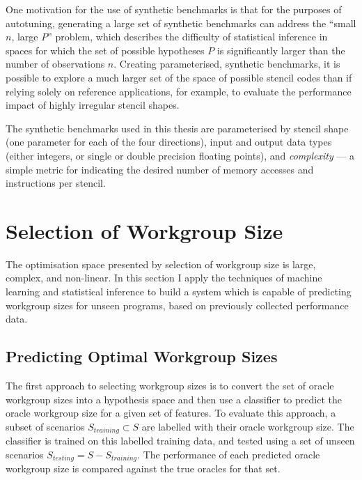 One motivation for the use of synthetic benchmarks is that for the
purposes of autotuning, generating a large set of synthetic benchmarks
can address the ``small $n$, large $P$'' problem, which describes the
difficulty of statistical inference in spaces for which the set of
possible hypotheses $P$ is significantly larger than the number of
observations $n$\CitationNeeded{}. Creating parameterised, synthetic
benchmarks, it is possible to explore a much larger set of the space
of possible stencil codes than if relying solely on reference
applications, for example, to evaluate the performance impact of
highly irregular stencil shapes.


The synthetic benchmarks used in this thesis are parameterised by
stencil shape (one parameter for each of the four directions), input
and output data types (either integers, or single or double precision
floating points), and \emph{complexity} --- a simple metric for
indicating the desired number of memory accesses and instructions per
stencil.


\section{Selection of Workgroup Size}

The optimisation space presented by selection of workgroup size is
large, complex, and non-linear. In this section I apply the techniques
of machine learning and statistical inference to build a system which
is capable of predicting workgroup sizes for unseen programs, based on
previously collected performance data.


\subsection{Predicting Optimal Workgroup Sizes}

The first approach to selecting workgroup sizes is to convert the set
of oracle workgroup sizes into a hypothesis space and then use a
classifier to predict the oracle workgroup size for a given set of
features. To evaluate this approach, a subset of scenarios
$S_{training} \subset S$ are labelled with their oracle workgroup
size. The classifier is trained on this labelled training data, and
tested using a set of unseen scenarios
$S_{testing} = S - S_{training}$. The performance of each predicted
oracle workgroup size is compared against the true oracles for that
set.


